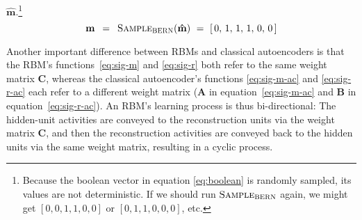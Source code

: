 $\mathbf{\hat{m}}$.\footnote{Because the boolean vector in equation \eqref{eq:boolean} is randomly sampled, its values are not deterministic. If we should run $\textsc{Sample}_{\textsc{BERN}}$ again, we might get $[0, 0, 1, 1, 0, 0]$ 
or $[0, 1, 1, 0, 0, 0]$, etc.}
\begin{equation}\label{eq:boolean}
\mathbf{m} \,\,\, =  \,\,\,   \textsc{Sample}_{\textsc{BERN}}(\mathbf{\hat{m}})  \,\,  =  \,\,   [ \, 0, \, 1, \, 1, \, 1, \, 0, \, 0 \,]
\end{equation}


Another important difference between
RBMs and classical autoencoders is that the RBM's functions~\eqref{eq:sig-m} and \eqref{eq:sig-r} 
both refer to the same weight matrix $\textbf{C}$, whereas the classical 
autoencoder's  functions \eqref{eq:sig-m-ac} and \eqref{eq:sig-r-ac} each 
refer to a different weight matrix 
($\textbf{A}$ in equation~\eqref{eq:sig-m-ac} and $\textbf{B}$ in equation~\eqref{eq:sig-r-ac}). 
An RBM's learning process is thus bi-directional: 
The hidden-unit activities are conveyed to the reconstruction 
units via the weight matrix $\textbf{C}$, and then the reconstruction 
activities are conveyed back to the hidden units via the same weight matrix, resulting in a cyclic process.
 

